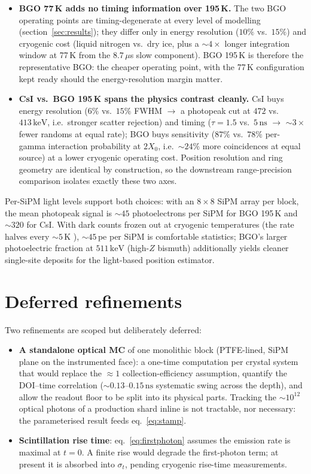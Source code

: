 \documentclass[11pt,a4paper]{article}
\newcommand{\ns}{\,\mathrm{ns}}
\newcommand{\keV}{\,\mathrm{keV}}
\begin{document}
\begin{itemize}
\item \textbf{BGO 77\,K adds no timing information over 195\,K.} The two BGO operating points
  are timing-degenerate at every level of modelling (section~\ref{sec:results}); they differ
  only in energy resolution ($10\%$ vs.\ $15\%$) and cryogenic cost (liquid nitrogen vs.\ dry
  ice, plus a ${\sim}4\times$ longer integration window at 77\,K from the $8.7\,\mu$s slow
  component). BGO 195\,K is therefore the representative BGO: the cheaper operating point,
  with the 77\,K configuration kept ready should the energy-resolution margin matter.
\item \textbf{CsI vs.\ BGO 195\,K spans the physics contrast cleanly.} CsI buys energy
  resolution ($6\%$ vs.\ $15\%$ FWHM $\to$ a photopeak cut at $472$ vs.\ $413\keV$, i.e.\
  stronger scatter rejection) and timing ($\tau = 1.5$ vs.\ $5\ns$ $\to$ ${\sim}3\times$ fewer
  randoms at equal rate); BGO buys sensitivity ($87\%$ vs.\ $78\%$ per-gamma interaction
  probability at $2X_0$, i.e.\ ${\sim}24\%$ more coincidences at equal source) at a lower
  cryogenic operating cost. Position resolution and ring geometry are identical by
  construction, so the downstream range-precision comparison isolates exactly these two axes.
\end{itemize}

Per-SiPM light levels support both choices: with an $8\times8$ SiPM array per block, the mean
photopeak signal is ${\sim}45$ photoelectrons per SiPM for BGO 195\,K and ${\sim}320$ for CsI.
With dark counts frozen out at cryogenic temperatures (the rate halves every ${\sim}5$\,K
\cite{Soleti2024}), ${\sim}45$\,pe per SiPM is comfortable statistics; BGO's larger
photoelectric fraction at $511\keV$ (high-$Z$ bismuth) additionally yields cleaner single-site
deposits for the light-based position estimator.

\section{Deferred refinements}
\label{sec:deferred}

Two refinements are scoped but deliberately deferred:
\begin{itemize}
\item \textbf{A standalone optical MC} of one monolithic block (PTFE-lined, SiPM plane on the
  instrumented face): a one-time computation per crystal system that would replace the
  ${\approx}1$ collection-efficiency assumption, quantify the DOI--time correlation
  (${\sim}0.13$--$0.15\ns$ systematic swing across the depth), and allow the readout floor to
  be split into its physical parts. Tracking the ${\sim}10^{12}$ optical photons of a
  production shard inline is not tractable, nor necessary: the parameterised result feeds
  eq.~\eqref{eq:stamp}.
\item \textbf{Scintillation rise time}: eq.~\eqref{eq:firstphoton} assumes the emission rate is
  maximal at $t=0$. A finite rise would degrade the first-photon term; at present it is
  absorbed into $\sigma_t$, pending cryogenic rise-time measurements.
\end{itemize}
\end{document}
